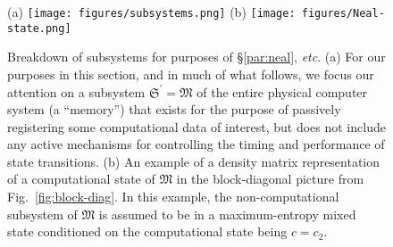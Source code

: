 \documentclass[preprints,article,accept,moreauthors,pdftex]{Definitions/mdpi}
\begin{document}
\begin{figure}[t] %
\widefigure
    \centerline{(a) \texttt{[image: figures/subsystems.png]} (b) \texttt{[image: figures/Neal-state.png]}}
    \caption{Breakdown of subsystems for purposes of \S\ref{par:neal}, \textit{etc}\@. (a) For our purposes in this section, and in much of what follows, we focus our attention on a subsystem $\mathfrak{S}^{\prime} = \mathfrak{M}$ of the entire physical computer system (a ``memory'') that exists for the purpose of passively registering some computational data of interest, but does not include any active mechanisms for controlling the timing and performance of state transitions. (b) An example of a density matrix representation of a computational state of $\mathfrak{M}$ in the block-diagonal picture from Fig.~\ref{fig:block-diag}. In this example, the non-computational subsystem of $\mathfrak{M}$ is assumed to be in a maximum-entropy mixed state conditioned on the computational state being $c=c_2$.
    \label{fig:neal}}
\end{figure}
\end{document}
